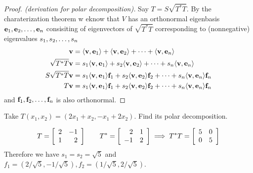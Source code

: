 \begin{proof}[Proof. (derivation for polar decomposition)]
	Say $T = S\sqrt{T^*T}$. By the charaterization theorem w eknow that $V$ has an orthonormal eigenbasis ${\mathbf e}_1,{\mathbf e}_2, \ldots, {\mathbf e}_{n}$ consisiting of eigenvectors of $\sqrt{T^*T}$ corresponding to (nonnegative) eigenvalues ${s}_1,{s}_2, \ldots, {s}_{n}$ 
	\begin{align*}
	\mathbf v &= \langle \mathbf v, \mathbf e_1 \rangle + \langle \mathbf v, \mathbf e_2 \rangle + \cdots + \langle \mathbf v, \mathbf e_n \rangle \\ 
	\sqrt{T^*T} \mathbf v &= s_1\langle \mathbf v, \mathbf e_1 \rangle + s_2\langle \mathbf v, \mathbf e_2 \rangle + \cdots + s_n\langle \mathbf v, \mathbf e_n \rangle \\
	S\sqrt{T^*T}\mathbf v &= s_1\langle \mathbf v, \mathbf e_1 \rangle\mathbf f_1 + s_2\langle \mathbf v, \mathbf e_2 \rangle\mathbf f_2 + \cdots + s_n\langle \mathbf v, \mathbf e_n \rangle\mathbf f_n \\
	T\mathbf v &= s_1\langle \mathbf v, \mathbf e_1 \rangle\mathbf f_1 + s_2\langle \mathbf v, \mathbf e_2 \rangle\mathbf f_2 + \cdots + s_n\langle \mathbf v, \mathbf e_n \rangle\mathbf f_n
	\end{align*}
	and ${\mathbf f}_1,{\mathbf f}_2, \ldots, {\mathbf f}_{n}$ is also orthonormal.
\end{proof}
\begin{example}
	Take $T(x_1, x_2) = (2x_1 + x_2, -x_1 + 2x_2)$.
	Find its polar decomposition.
\end{example}
\begin{answer}
	\[T = \left[ \begin{array}{rrrrrrrrrrrrrrrrr} 2 & -1 \\ 1 & 2 \end{array} \right] \qquad T^* = \left[ \begin{array}{rrrrrrrrrrrrrrrrr} 2 & 1 \\ -1 & 2 \end{array} \right] \implies T^*T = \left[ \begin{array}{rrrrrrrrrrrrrrrrr} 5 & 0 \\ 0 & 5 \end{array} \right]\]
	Therefore we have $s_1 = s_2 = \sqrt 5$ and $f_1 = \left(2 / \sqrt 5, -1 / \sqrt 5\right),f_2 = \left(1 / \sqrt 5, 2 / \sqrt 5\right)$.
\end{answer}
